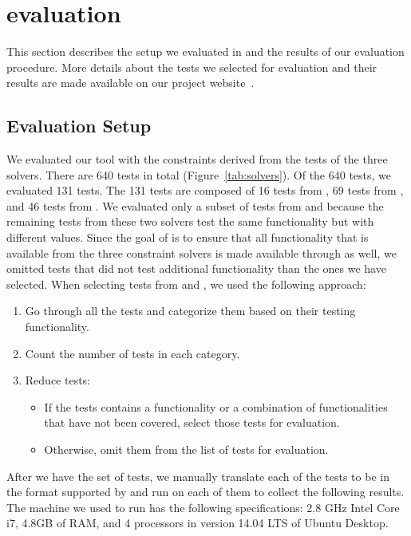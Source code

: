 \section{evaluation}
\newcommand{\totaltests}{640\xspace}
\newcommand{\pickedtests}{131\xspace}
\newcommand{\dprlePtests}{16\xspace}
\newcommand{\hampiPtests}{69\xspace}
\newcommand{\zPtests}{46\xspace}

This section describes the setup we evaluated \imss in and the results of our evaluation procedure. More details about the tests we selected for evaluation and their results are made available on our project website~\cite{imss}.

\label{sec:evaluation}
\subsection{Evaluation Setup}
We evaluated our tool with the constraints derived from the tests of the three solvers.
There are \totaltests tests in total (Figure~\ref{tab:solvers}). Of the \totaltests
tests, we evaluated \pickedtests tests. The \pickedtests tests are composed of
\dprlePtests tests from \dprle, \hampiPtests tests from \hampi, and \zPtests tests from \zstr.
We evaluated only a subset of tests from \hampi and \zstr because the remaining tests
from these two solvers test the same functionality but with different values.
Since the goal of \imss is to ensure that all functionality that is available
from the three constraint solvers is made available through \imss as well, we
omitted tests that did not test additional functionality than the ones we have
selected. When selecting tests from \zstr and \hampi,
we used the following approach:
\begin{enumerate}
    \item Go through all the tests and categorize them based on their testing functionality.
    \item Count the number of tests in each category.
    \item Reduce tests:
        \begin{itemize}
            \item If the tests contains a functionality or a combination of functionalities that have not been covered, select those tests for evaluation.
            \item Otherwise, omit them from the list of tests for evaluation.
        \end{itemize}
\end{enumerate}
After we have the set of tests, we manually translate each of the tests to be in the
format supported by \imss and run \imss on each of them to collect the following results.
The machine we used to run \imss has the following specifications: 2.8 GHz Intel Core i7, 4.8GB of RAM, and 4 processors in version 14.04 LTS of Ubuntu Desktop.

